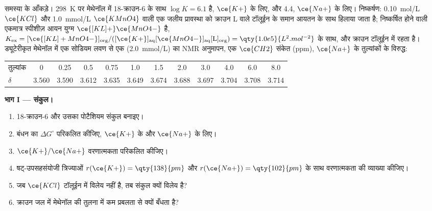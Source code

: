 \begin{problem}
\label{pb:b3:supramolecular:1}
समस्या के आँकड़े। \qty{298}{K} पर मेथेनॉल में 18-क्राउन-6 के साथ $\log K = 6.1$ है, $\ce{K+}$ के लिए, और 4.4, $\ce{Na+}$ के लिए।
निष्कर्षण: \qty{0.10}{mol/L} $\ce{KCl}$ और \qty{1.0}{mmol/L} $\ce{KMnO4}$ वाली एक जलीय प्रावस्था को
क्राउन L वाले टॉलूईन के समान आयतन के साथ हिलाया जाता है; निष्कर्षित होने वाली एकमात्र
स्पीशीज़ आयन युग्म $\ce{[KL]+}\ce{MnO4-}$ है,
$K_{\mathrm{ex}} = [\ce{[KL]+MnO4-}]_{\mathrm{org}}/([\ce{K+}]_{\mathrm{aq}}[\ce{MnO4-}]_{\mathrm{aq}}[\mathrm L]_{\mathrm{org}}) = \qty{1.0e5}{L^2.mol^{-2}}$ के साथ, और क्राउन टॉलूईन में रहता है। ड्यूटेरीकृत मेथेनॉल में
एक सोडियम लवण से एक  (\qty{2.0}{mmol/L}) का NMR अनुमापन, एक $\ce{CH2}$ संकेत
(ppm), $\ce{Na+}$ के तुल्यांकों के विरुद्ध:

\begin{center}\small
\begin{tabular}{l*{11}{c}}
\hline
तुल्यांक & 0 & 0.25 & 0.5 & 0.75 & 1.0 & 1.5 & 2.0 & 3.0 & 4.0 & 6.0 & 8.0\\
$\delta$ & 3.560 & 3.590 & 3.612 & 3.635 & 3.649 & 3.674 & 3.688 & 3.697 & 3.704 & 3.708 & 3.714\\
\hline
\end{tabular}
\end{center}

\medskip\noindent\textbf{भाग I --- संकुल।}
\begin{enumerate}
  \item 18-क्राउन-6 और उसका पोटैशियम संकुल बनाइए।
  \item बंधन का $\Delta G^\circ$ परिकलित कीजिए, $\ce{K+}$ के और $\ce{Na+}$ के लिए।
  \item $\ce{K+}/\ce{Na+}$ वरणात्मकता परिकलित कीजिए।
  \item षट्-उपसहसंयोजी त्रिज्याओं $r(\ce{K+}) = \qty{138}{pm}$ और $r(\ce{Na+}) = \qty{102}{pm}$ के साथ वरणात्मकता की व्याख्या कीजिए।
  \item जब $\ce{KCl}$ टॉलूईन में विलेय नहीं है, तब संकुल क्यों विलेय है?
  \item क्राउन जल में मेथेनॉल की तुलना में कम प्रबलता से क्यों बँधता है?
\end{enumerate}


\end{problem}
